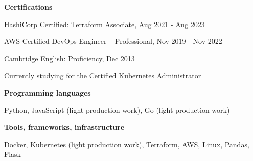 \documentclass{article}
\begin{document}
\textbf{Certifications}

\hspace{1em}HashiCorp Certified: Terraform Associate, Aug 2021 - Aug 2023

\hspace{1em}AWS Certified DevOps Engineer – Professional, Nov 2019 - Nov 2022

\hspace{1em}Cambridge English: Proficiency, Dec 2013

\hspace{1em}Currently studying for the Certified Kubernetes Administrator

\textbf{Programming languages}

\hspace{1em}Python, JavaScript (light production work), Go (light production work)

\textbf{Tools, frameworks, infrastructure}

\hspace{1em}Docker, Kubernetes (light production work), Terraform, AWS, Linux, Pandas, Flask
\end{document}

